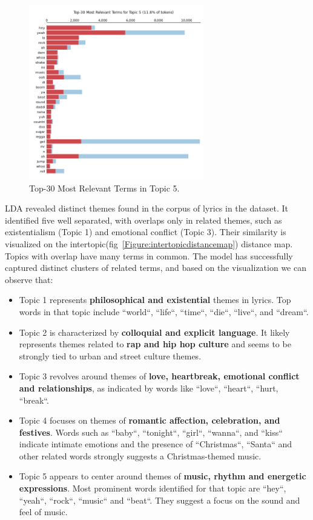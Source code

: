 \begin{center}
\begin{figure}[H]
  \centering
  \includegraphics[width=3in]{img/topics/png/t5.png}
  \caption{Top-30 Most Relevant Terms in Topic 5.}
  \label{Figure:fig_eh}
\end{figure}
\end{center}

LDA  revealed distinct themes found in the corpus of  lyrics in the dataset. It
identified five well separated, with overlaps only in related themes, such as
existentialism (Topic 1) and emotional conflict (Topic 3). Their similarity 
is visualized on the intertopic(fig~\ref{Figure:intertopicdistancemap})
distance map. Topics with overlap have  many terms in common. The model has
successfully captured distinct clusters of related terms, and based on the
visualization we can observe that:

\begin{itemize}
     \item Topic 1 represents \textbf{philosophical and existential} themes in lyrics.
      Top words in that topic include ``world``, ``life``, ``time``, ``die``,
      ``live``, and ``dream``.
    \item Topic 2 is characterized by \textbf{colloquial and explicit
      language}. It likely represents themes related to \textbf{rap and hip hop culture}
      and seems to be strongly tied to urban and street culture themes.
    \item Topic 3 revolves around themes of \textbf{love, heartbreak, emotional
      conflict and relationships}, as indicated by words like ``love``,
      ``heart``, ``hurt, ``break``.
    \item Topic 4 focuses on themes of \textbf{romantic affection, celebration,
      and festives}. Words such as ``baby``, ``tonight``, ``girl``, ``wanna``,
      and ``kiss`` indicate intimate emotions and the presence of
      ``Christmas``, ``Santa`` and other related words strongly suggests a
      Christmas-themed music.
    \item Topic 5 appears to center around themes of \textbf{music, rhythm and
      energetic expressions}. Most prominent words identified for that topic
      are ``hey``, ``yeah``, ``rock``, ``music`` and ``beat``. They suggest a
      focus on the sound and feel of music. 
\end{itemize}


